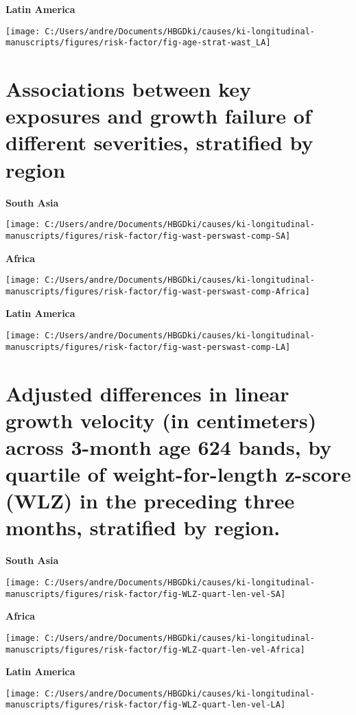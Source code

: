 \documentclass[
  9pt,
]{book}
\begin{document}
\textbf{Latin America}

\texttt{[image: C:/Users/andre/Documents/HBGDki/causes/ki-longitudinal-manuscripts/figures/risk-factor/fig-age-strat-wast\_LA]}

\hypertarget{associations-between-key-exposures-and-growth-failure-of-different-severities-stratified-by-region}{%
\section{Associations between key exposures and growth failure of different severities, stratified by region}\label{associations-between-key-exposures-and-growth-failure-of-different-severities-stratified-by-region}}

\textbf{South Asia}

\texttt{[image: C:/Users/andre/Documents/HBGDki/causes/ki-longitudinal-manuscripts/figures/risk-factor/fig-wast-perswast-comp-SA]}

\textbf{Africa}

\texttt{[image: C:/Users/andre/Documents/HBGDki/causes/ki-longitudinal-manuscripts/figures/risk-factor/fig-wast-perswast-comp-Africa]}

\textbf{Latin America}

\texttt{[image: C:/Users/andre/Documents/HBGDki/causes/ki-longitudinal-manuscripts/figures/risk-factor/fig-wast-perswast-comp-LA]}

\hypertarget{adjusted-differences-in-linear-growth-velocity-in-centimeters-across-3-month-age-624-bands-by-quartile-of-weight-for-length-z-score-wlz-in-the-preceding-three-months-stratified-by-region.}{%
\section{Adjusted differences in linear growth velocity (in centimeters) across 3-month age 624 bands, by quartile of weight-for-length z-score (WLZ) in the preceding three months, stratified by region.}\label{adjusted-differences-in-linear-growth-velocity-in-centimeters-across-3-month-age-624-bands-by-quartile-of-weight-for-length-z-score-wlz-in-the-preceding-three-months-stratified-by-region.}}

\textbf{South Asia}

\texttt{[image: C:/Users/andre/Documents/HBGDki/causes/ki-longitudinal-manuscripts/figures/risk-factor/fig-WLZ-quart-len-vel-SA]}

\textbf{Africa}

\texttt{[image: C:/Users/andre/Documents/HBGDki/causes/ki-longitudinal-manuscripts/figures/risk-factor/fig-WLZ-quart-len-vel-Africa]}

\textbf{Latin America}

\texttt{[image: C:/Users/andre/Documents/HBGDki/causes/ki-longitudinal-manuscripts/figures/risk-factor/fig-WLZ-quart-len-vel-LA]}

  
\end{document}
